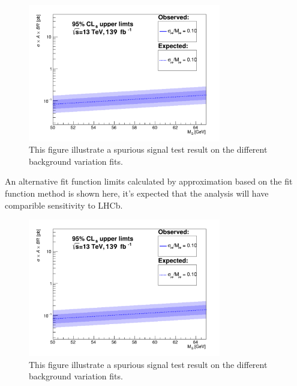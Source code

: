 \begin{figure}[!htb]
    \begin{center}
        \includegraphics[width=0.75\textwidth]{figures/chapter_dimuon/limits}       
        \caption{
        This figure illustrate a spurious signal test result on the different background variation fits.}
    \end{center}
\end{figure}

An alternative fit function limits calculated by approximation based on the fit function method is shown here, it's expected that the analysis will have comparible sensitivity to LHCb. 

\begin{figure}[!htb]
    \begin{center}
        \includegraphics[width=0.75\textwidth]{figures/chapter_dimuon/limits}
        \caption{
        This figure illustrate a spurious signal test result on the different background variation fits.}
    \end{center}
\end{figure}



